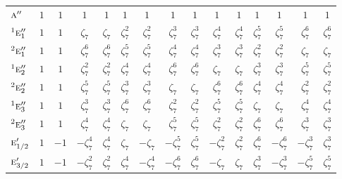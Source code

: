 \documentclass[10pt,a4paper]{article}
\makeatletter
\def\grouprule#1#2{\noalign{\marks\LTgroupmarks{\the\belowrulesep}\nobreak\vskip#1%
  \vskip\aboverulesep}\multispan\LT@cols\unskip{\leaders\hrule\@height#2\hfill\kern\z@}\cr
  \noalign{\penalty\LTrulebreak\vskip\belowrulesep\global\@lastruleclass\z@}}
\numberwithin{equation}{section}
\newcommand{\irr}[1]{\text{\normalfont\scshape #1}}
\newcommand{\conjpair}[1]{{}^{#1}}
\newcommand{\rootunity}[1]{\zeta_{#1}}
\makeatother
\begin{document}
{\begin{longtable}{@{}lcccccccccccccc@{}}
$\irr{a}''$ & $1$ & $1$ & $1$ & $1$ & $1$ & $1$ & $1$ & $1$ & $1$ & $1$ & $1$ & $1$ & $1$ & $1$\\
$\conjpair{1}\irr{e}_{1}''$ & $1$ & $1$ & $\rootunity{7}$ & $\rootunity{7}$ & $\rootunity{7}^{2}$ & $\rootunity{7}^{2}$ & $\rootunity{7}^{3}$ & $\rootunity{7}^{3}$ & $\rootunity{7}^{4}$ & $\rootunity{7}^{4}$ & $\rootunity{7}^{5}$ & $\rootunity{7}^{5}$ & $\rootunity{7}^{6}$ & $\rootunity{7}^{6}$\\
$\conjpair{2}\irr{e}_{1}''$ & $1$ & $1$ & $\rootunity{7}^{6}$ & $\rootunity{7}^{6}$ & $\rootunity{7}^{5}$ & $\rootunity{7}^{5}$ & $\rootunity{7}^{4}$ & $\rootunity{7}^{4}$ & $\rootunity{7}^{3}$ & $\rootunity{7}^{3}$ & $\rootunity{7}^{2}$ & $\rootunity{7}^{2}$ & $\rootunity{7}$ & $\rootunity{7}$\\
$\conjpair{1}\irr{e}_{2}''$ & $1$ & $1$ & $\rootunity{7}^{2}$ & $\rootunity{7}^{2}$ & $\rootunity{7}^{4}$ & $\rootunity{7}^{4}$ & $\rootunity{7}^{6}$ & $\rootunity{7}^{6}$ & $\rootunity{7}$ & $\rootunity{7}$ & $\rootunity{7}^{3}$ & $\rootunity{7}^{3}$ & $\rootunity{7}^{5}$ & $\rootunity{7}^{5}$\\
$\conjpair{2}\irr{e}_{2}''$ & $1$ & $1$ & $\rootunity{7}^{5}$ & $\rootunity{7}^{5}$ & $\rootunity{7}^{3}$ & $\rootunity{7}^{3}$ & $\rootunity{7}$ & $\rootunity{7}$ & $\rootunity{7}^{6}$ & $\rootunity{7}^{6}$ & $\rootunity{7}^{4}$ & $\rootunity{7}^{4}$ & $\rootunity{7}^{2}$ & $\rootunity{7}^{2}$\\
$\conjpair{1}\irr{e}_{3}''$ & $1$ & $1$ & $\rootunity{7}^{3}$ & $\rootunity{7}^{3}$ & $\rootunity{7}^{6}$ & $\rootunity{7}^{6}$ & $\rootunity{7}^{2}$ & $\rootunity{7}^{2}$ & $\rootunity{7}^{5}$ & $\rootunity{7}^{5}$ & $\rootunity{7}$ & $\rootunity{7}$ & $\rootunity{7}^{4}$ & $\rootunity{7}^{4}$\\
$\conjpair{2}\irr{e}_{3}''$ & $1$ & $1$ & $\rootunity{7}^{4}$ & $\rootunity{7}^{4}$ & $\rootunity{7}$ & $\rootunity{7}$ & $\rootunity{7}^{5}$ & $\rootunity{7}^{5}$ & $\rootunity{7}^{2}$ & $\rootunity{7}^{2}$ & $\rootunity{7}^{6}$ & $\rootunity{7}^{6}$ & $\rootunity{7}^{3}$ & $\rootunity{7}^{3}$\\
\grouprule{0pt}{\lightrulewidth}
$\irr{e}_{1/2}'$ & $1$ & $-1$ & $-\rootunity{7}^{4}$ & $\rootunity{7}^{4}$ & $\rootunity{7}$ & $-\rootunity{7}$ & $-\rootunity{7}^{5}$ & $\rootunity{7}^{5}$ & $-\rootunity{7}^{2}$ & $\rootunity{7}^{2}$ & $\rootunity{7}^{6}$ & $-\rootunity{7}^{6}$ & $-\rootunity{7}^{3}$ & $\rootunity{7}^{3}$\\
$\irr{e}_{3/2}'$ & $1$ & $-1$ & $-\rootunity{7}^{2}$ & $\rootunity{7}^{2}$ & $\rootunity{7}^{4}$ & $-\rootunity{7}^{4}$ & $-\rootunity{7}^{6}$ & $\rootunity{7}^{6}$ & $-\rootunity{7}$ & $\rootunity{7}$ & $\rootunity{7}^{3}$ & $-\rootunity{7}^{3}$ & $-\rootunity{7}^{5}$ & $\rootunity{7}^{5}$\\

\end{longtable}}
\end{document}
